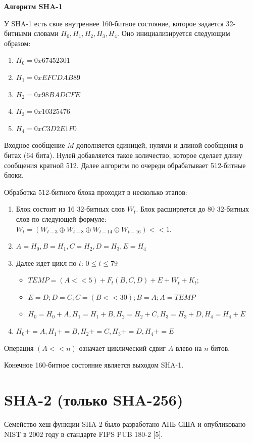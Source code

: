 \documentclass[colorthm]{./civarticle}
\begin{document}
\textbf{Алгоритм SHA-1}

У SHA-1 есть свое внутреннее 160-битное состояние, которое задается 32-битными словами $H_0, H_1, H_2, H_3, H_4$. Оно инициализируется следующим образом:

\begin{enumerate}
    \item $H_0 = 0x67452301$
    \item $H_1 = 0xEFCDAB89$
    \item $H_2 = 0x98BADCFE$
    \item $H_3 = 0x10325476$
    \item $H_4 = 0xC3D2E1F0$
\end{enumerate}

Входное сообщение $M$ дополняется единицей, нулями и длиной сообщения в битах (64 бита). Нулей добавляется такое количество, которое сделает длину сообщения кратной 512. Далее алгоритм по очереди обрабатывает 512-битные блоки.

Обработка 512-битного блока проходит в несколько этапов:

\begin{enumerate}
    \item Блок состоит из 16 32-битных слов $W_t$. Блок расширяется до 80 32-битных слов по следующей формуле: $W_t = (W_{t-3} \oplus W_{t-8} \oplus W_{t-14} \oplus W_{t-16}) << 1$. 
    \item $A = H_0, B = H_1, C = H_2, D = H_3, E = H_4$
    \item Далее идет цикл по $t$: $0 \leq t \leq 79$ 
    
    \begin{itemize}
     \item $TEMP = (A << 5) + F_t(B,C,D) + E + W_t + K_t;$
     \item $E = D;  D = C;  C = (B << 30);  B = A; A = TEMP$
     \item $H_0 = H_0 + A, H_1 = H_1 + B, H_2 = H_2 + C, H_3 = H_3 + D, H_4 = H_4 + E$    
    \end{itemize}
    \item $H_0 += A, H_1 += B, H_2 += C, H_3 += D, H_4 += E$
\end{enumerate}

Операция $(A << n)$ означает циклический сдвиг $A$ влево на $n$ битов.

Конечное 160-битное состояние является выходом SHA-1.

\section{SHA-2 (только SHA-256)}
Семейство хеш-функции SHA-2 было разработано АНБ США и опубликовано NIST в 2002 году в стандарте FIPS PUB 180-2 [5].
\end{document}
